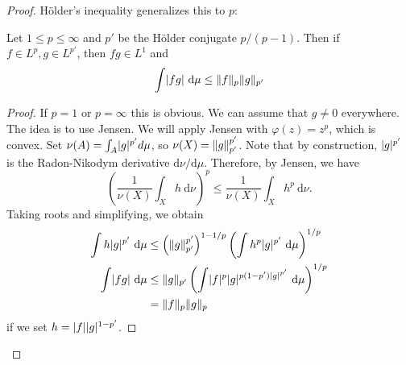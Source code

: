 \documentclass[10pt, twoside]{article}
\renewcommand{\d}{\ \mathrm{d}}
\begin{document}
\begin{thm}
\begin{proof}
            
            H\"older's inequality generalizes this to $p$:
            \begin{mdframed}[style=default] \begin{thm}
                Let $1 \leq p \leq \infty$ and $p'$ be the H\"older conjugate
                $p/(p-1)$. Then if $f \in L^p, g \in L^{p'}$, then $fg \in L^1$
                and \[ \int \abs{fg} \d \mu \leq \norm{f}_p \norm{g}_{p'} \]
                \end{thm} \begin{proof} If $p=1$ or $p = \infty$ this is
                obvious. We can assume that $g \neq 0$ everywhere. The idea is
                to use Jensen. We will apply Jensen with $\varphi(z) = z^p$,
                which is convex. Set $\nu(A) = \int_A \lvert g\rvert^{p'} d \mu$, so
                $\nu(X) = \lVert g\rVert_{p'}^{p'}$. Note that by construction,
                $\lvert g\rvert^{p'}$ is the Radon-Nikodym derivative
                $\mathrm{d}\nu/\mathrm{d}\mu$. Therefore, by Jensen, we have
                \[\left( \frac{1}{\nu(X)} \int_X h \d \nu \right)^p \leq
                    \frac{1}{\nu(X)} \int_X h^p \d \nu.\] Taking roots and
                    simplifying, we obtain \begin{align*} \int h\abs{g}^{p'} \d
                        \mu &\leq \left( \norm{g}_{p'}^{p'} \right)^{1-1/p}
                        \left( \int h^p \abs{g}^{p'} \d \mu \right)^{1/p} \\
                    \int \abs{fg} \d \mu &\leq \norm{g}_{p'} \left( \int
                \abs{f}^p \abs{g}^{p(1-p') \abs{g}^{p'}} \d \mu \right)^{1/p}
                                      \\ &= \norm{f}_p\norm{g}_p \end{align*}
                                      if we set $h = \lvert f\rvert\lvert g\rvert^{1-p'}$.
                                  \end{proof} \end{mdframed}


\end{proof}
\end{thm}
\end{document}
